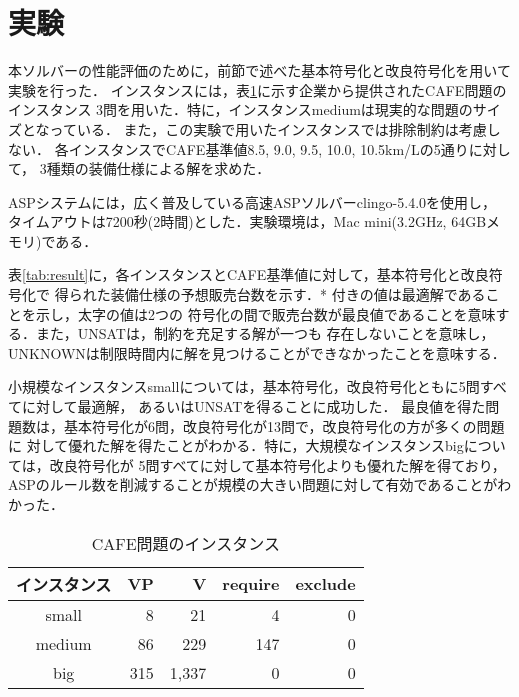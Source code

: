 \section{実験}
本ソルバーの性能評価のために，前節で述べた基本符号化と改良符号化を用いて実験を行った．
インスタンスには，表\ref{tab:instance}に示す企業から提供されたCAFE問題のインスタンス
3問を用いた．特に，インスタンスmediumは現実的な問題のサイズとなっている．
また，この実験で用いたインスタンスでは排除制約は考慮しない．
各インスタンスでCAFE基準値8.5, 9.0, 9.5, 10.0, 10.5km/Lの5通りに対して，
3種類の装備仕様による解を求めた．

ASPシステムには，広く普及している高速ASPソルバーclingo-5.4.0を使用し，
タイムアウトは7200秒(2時間)とした．実験環境は，Mac mini(3.2GHz, 64GBメモリ)である．

表\ref{tab:result}に，各インスタンスとCAFE基準値に対して，基本符号化と改良符号化で
得られた装備仕様の予想販売台数を示す．* 付きの値は最適解であることを示し，太字の値は2つの
符号化の間で販売台数が最良値であることを意味する．また，UNSATは，制約を充足する解が一つも
存在しないことを意味し，UNKNOWNは制限時間内に解を見つけることができなかったことを意味する．


小規模なインスタンスsmallについては，基本符号化，改良符号化ともに5問すべてに対して最適解，
あるいはUNSATを得ることに成功した．
最良値を得た問題数は，基本符号化が6問，改良符号化が13問で，改良符号化の方が多くの問題に
対して優れた解を得たことがわかる．特に，大規模なインスタンスbigについては，改良符号化が
5問すべてに対して基本符号化よりも優れた解を得ており，
ASPのルール数を削減することが規模の大きい問題に対して有効であることがわかった．


\begin{table}[tb]
 \caption{CAFE問題のインスタンス}
 \centering
 \begin{tabular}{crrrr} \bhline
  インスタンス & VP	& V	& require & exclude	\\\hline
  small	    & 8		& 21	& 4	  & 0	        \\
  medium    & 86	& 229	& 147	  & 0	        \\
  big	    & 315	& 1,337	& 0	  & 0        	\\\hline
 \end{tabular}
 \label{tab:instance}
\end{table}

